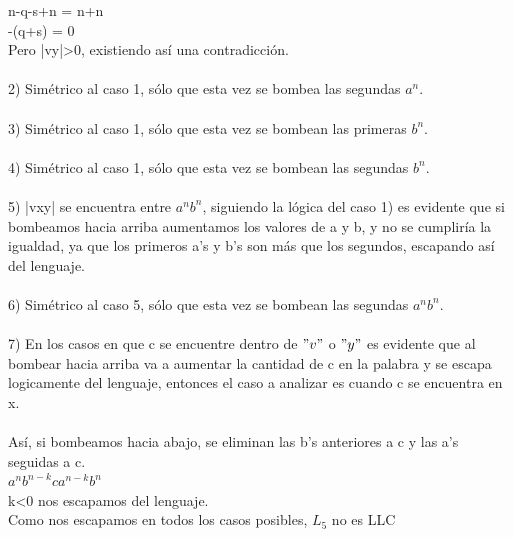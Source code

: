 \documentclass[11pt,letterpaper]{article}
\begin{document}
\indent n-q-s+n = n+n \\
\indent -(q+s) = 0 \\
\indent Pero |vy|>0, existiendo así una contradicción. \\
 \\
2) Simétrico al caso 1, sólo que esta vez se bombea las segundas $a^n$. \\
 \\
3) Simétrico al caso 1, sólo que esta vez se bombean las primeras $b^n$. \\
 \\
4) Simétrico al caso 1, sólo que esta vez se bombean las segundas $b^n$. \\
 \\
5) |vxy| se encuentra entre $a^nb^n$, siguiendo la lógica del caso 1) es evidente que si bombeamos hacia arriba aumentamos los valores de a y b, y no se cumpliría la igualdad, ya que los primeros a's y b's son más que los segundos, escapando así del lenguaje. \\
 \\
6) Simétrico al caso 5, sólo que esta vez se bombean las segundas $a^nb^n$. \\
 \\
7) En los casos en que c se encuentre dentro de $"v"$ o $"y"$ es evidente que al bombear hacia arriba va a aumentar la cantidad de c en la palabra y se escapa logicamente del lenguaje, entonces el caso a analizar es cuando c se encuentra en x. \\
 \\
\indent Así, si bombeamos hacia abajo, se eliminan las b's anteriores a c y las a's seguidas a c. \\
\indent $a^nb^{n-k}ca^{n-k}b^n$ \\
\indent k<0 nos escapamos del lenguaje. \\

\noindent Como nos escapamos en todos los casos posibles, $L_{5}$ no es LLC
\end{document}
